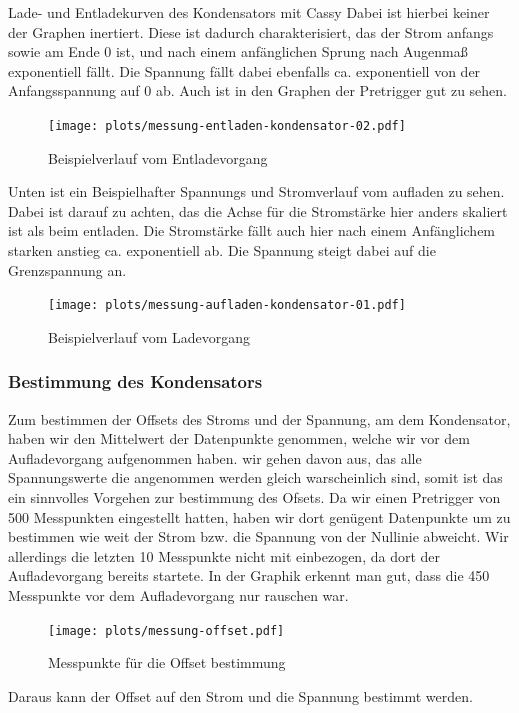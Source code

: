 \documentclass[twoside]{protokoll}
\begin{document}
\begin{aufgabe}{Lade- und Entladekurven des Kondensators mit Cassy}
    Dabei ist hierbei keiner der Graphen inertiert.
    Diese ist dadurch charakterisiert, das der Strom anfangs sowie am Ende 0 ist, und nach einem anfänglichen Sprung nach Augenmaß exponentiell fällt.
    Die Spannung fällt dabei ebenfalls ca. exponentiell von der Anfangsspannung auf 0 ab.
    Auch ist in den Graphen der Pretrigger gut zu sehen.
\begin{figure}[H]
  \centering
    \texttt{[image: plots/messung-entladen-kondensator-02.pdf]}
    \caption{Beispielverlauf vom Entladevorgang}
  \centering
\end{figure}
 
Unten ist ein Beispielhafter Spannungs und Stromverlauf vom aufladen zu sehen.
Dabei ist darauf zu achten, das die Achse für die Stromstärke hier anders skaliert ist als beim entladen.
Die Stromstärke fällt auch hier nach einem Anfänglichem starken anstieg ca. exponentiell ab.
Die Spannung steigt dabei auf die Grenzspannung an.
\begin{figure}[H]
  \centering
    \texttt{[image: plots/messung-aufladen-kondensator-01.pdf]}
    \caption{Beispielverlauf vom Ladevorgang}
  \centering
\end{figure}

\subsubsection{Bestimmung des Kondensators}

Zum bestimmen der Offsets des Stroms und der Spannung, am dem Kondensator, haben wir den Mittelwert der Datenpunkte genommen, welche wir vor dem Aufladevorgang aufgenommen haben.
wir gehen davon aus, das alle Spannungswerte die angenommen werden gleich warscheinlich sind, somit ist das ein sinnvolles Vorgehen zur bestimmung des Ofsets.
Da wir einen Pretrigger von 500 Messpunkten eingestellt hatten, haben wir dort genügent Datenpunkte um zu bestimmen wie weit der Strom bzw. die Spannung von der Nullinie abweicht.
Wir allerdings die letzten 10 Messpunkte nicht mit einbezogen, da dort der Aufladevorgang bereits startete.
In der Graphik erkennt man gut, dass die 450 Messpunkte vor dem Aufladevorgang nur rauschen war.
\begin{figure}[H]
  \centering
    \texttt{[image: plots/messung-offset.pdf]}
    \caption{Messpunkte für die Offset bestimmung}
  \centering
\end{figure}

Daraus kann der Offset auf den Strom und die Spannung bestimmt werden.


\end{aufgabe}
\end{document}
